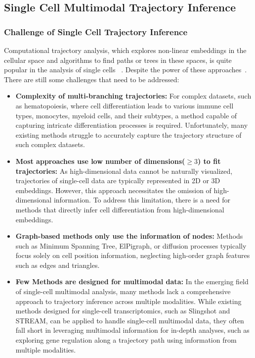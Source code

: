 \subsection{Single Cell Multimodal Trajectory Inference}
\subsubsection{Challenge of Single Cell Trajectory Inference}
\label{background:sec2:challenge_TI}

Computational trajectory analysis, which explores non-linear embeddings in the cellular space and algorithms to find paths or trees in these spaces, is quite popular in the analysis of single cells ~\citep{wolf2019paga,chen2019stream,street2018slingshot,Lynch2022}. Despite the power of these approaches~\cite{Saelens2019}. There are still some challenges that need to be addressed:

\begin{itemize}
	\item \textbf{Complexity of multi-branching trajectories:} 
	For complex datasets, such as hematopoiesis, where cell differentiation leads to various immune cell types, monocytes, myeloid cells, and their subtypes, a method capable of capturing intricate differentiation processes is required. Unfortunately, many existing methods struggle to accurately capture the trajectory structure of such complex datasets.

	\item \textbf{Most approaches use low number of dimensions($\geq3$) to fit trajectories:} 
	As high-dimensional data cannot be naturally visualized, trajectories of single-cell data are typically represented in 2D or 3D embeddings. However, this approach necessitates the omission of high-dimensional information. To address this limitation, there is a need for methods that directly infer cell differentiation from high-dimensional embeddings. 

	\item \textbf{Graph-based methods only use the information of nodes:} 
	Methods such as Minimum Spanning Tree, ElPigraph, or diffusion processes typically focus solely on cell position information, neglecting high-order graph features such as edges and triangles.   

	\item \textbf{Few Methods are designed for multimodal data:} 
	In the emerging field of single-cell multimodal analysis, many methods lack a comprehensive approach to trajectory inference across multiple modalities. While existing methods designed for single-cell transcriptomics, such as Slingshot and STREAM, can be applied to handle single-cell multimodal data, they often fall short in leveraging multimodal information for in-depth analyses, such as exploring gene regulation along a trajectory path using information from multiple modalities.
\end{itemize}

